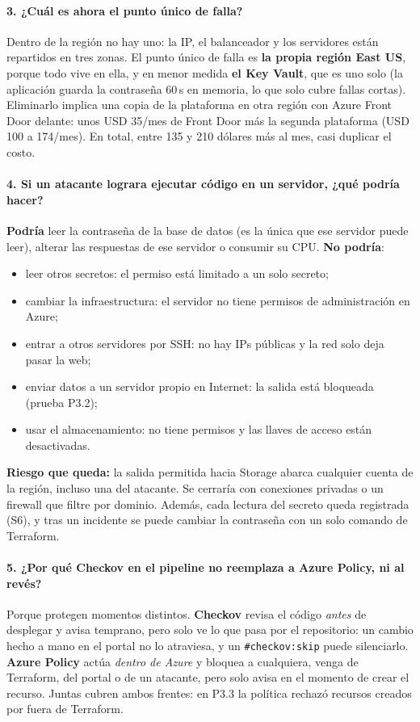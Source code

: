\paragraph{3. ¿Cuál es ahora el punto único de falla?}
Dentro de la región no hay uno: la IP, el balanceador y los servidores están repartidos en tres
zonas. El punto único de falla es \textbf{la propia región East US}, porque todo vive en ella, y en
menor medida \textbf{el Key Vault}, que es uno solo (la aplicación guarda la contraseña 60\,s en
memoria, lo que solo cubre fallas cortas). Eliminarlo implica una copia de la plataforma en otra
región con Azure Front Door delante: unos USD 35/mes de Front Door más la segunda plataforma
(USD 100 a 174/mes). En total, entre 135 y 210 dólares más al mes, casi duplicar el costo.

\paragraph{4. Si un atacante lograra ejecutar código en un servidor, ¿qué podría hacer?}
\textbf{Podría} leer la contraseña de la base de datos (es la única que ese servidor puede leer),
alterar las respuestas de ese servidor o consumir su CPU. \textbf{No podría}:
\begin{itemize}
  \item leer otros secretos: el permiso está limitado a un solo secreto;
  \item cambiar la infraestructura: el servidor no tiene permisos de administración en Azure;
  \item entrar a otros servidores por SSH: no hay IPs públicas y la red solo deja pasar la web;
  \item enviar datos a un servidor propio en Internet: la salida está bloqueada (prueba P3.2);
  \item usar el almacenamiento: no tiene permisos y las llaves de acceso están desactivadas.
\end{itemize}
\textbf{Riesgo que queda:} la salida permitida hacia Storage abarca cualquier cuenta de la región,
incluso una del atacante. Se cerraría con conexiones privadas o un firewall que filtre por dominio.
Además, cada lectura del secreto queda registrada (S6), y tras un incidente se puede cambiar la
contraseña con un solo comando de Terraform.

\paragraph{5. ¿Por qué Checkov en el pipeline no reemplaza a Azure Policy, ni al revés?}
Porque protegen momentos distintos. \textbf{Checkov} revisa el código \emph{antes} de desplegar y
avisa temprano, pero solo ve lo que pasa por el repositorio: un cambio hecho a mano en el portal no
lo atraviesa, y un \texttt{\#checkov:skip} puede silenciarlo. \textbf{Azure Policy} actúa
\emph{dentro de Azure} y bloquea a cualquiera, venga de Terraform, del portal o de un atacante, pero
solo avisa en el momento de crear el recurso. Juntas cubren ambos frentes: en P3.3 la política
rechazó recursos creados por fuera de Terraform.

